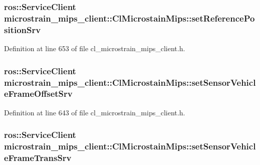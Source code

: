 \subsubsection[{\texorpdfstring{set\+Reference\+Position\+Srv}{setReferencePositionSrv}}]{\setlength{\rightskip}{0pt plus 5cm}ros\+::\+Service\+Client microstrain\+\_\+mips\+\_\+client\+::\+Cl\+Microstain\+Mips\+::set\+Reference\+Position\+Srv\hspace{0.3cm}{\ttfamily [protected]}}\hypertarget{classmicrostrain__mips__client_1_1ClMicrostainMips_a9f088d1a085409bf8a952fac38e8f3d3}{}\label{classmicrostrain__mips__client_1_1ClMicrostainMips_a9f088d1a085409bf8a952fac38e8f3d3}


Definition at line 653 of file cl\+\_\+microstrain\+\_\+mips\+\_\+client.\+h.

\subsubsection[{\texorpdfstring{set\+Sensor\+Vehicle\+Frame\+Offset\+Srv}{setSensorVehicleFrameOffsetSrv}}]{\setlength{\rightskip}{0pt plus 5cm}ros\+::\+Service\+Client microstrain\+\_\+mips\+\_\+client\+::\+Cl\+Microstain\+Mips\+::set\+Sensor\+Vehicle\+Frame\+Offset\+Srv\hspace{0.3cm}{\ttfamily [protected]}}\hypertarget{classmicrostrain__mips__client_1_1ClMicrostainMips_aa1d74713d0892154282f67b8a7724bdb}{}\label{classmicrostrain__mips__client_1_1ClMicrostainMips_aa1d74713d0892154282f67b8a7724bdb}


Definition at line 643 of file cl\+\_\+microstrain\+\_\+mips\+\_\+client.\+h.

\subsubsection[{\texorpdfstring{set\+Sensor\+Vehicle\+Frame\+Trans\+Srv}{setSensorVehicleFrameTransSrv}}]{\setlength{\rightskip}{0pt plus 5cm}ros\+::\+Service\+Client microstrain\+\_\+mips\+\_\+client\+::\+Cl\+Microstain\+Mips\+::set\+Sensor\+Vehicle\+Frame\+Trans\+Srv\hspace{0.3cm}{\ttfamily [protected]}}\hypertarget{classmicrostrain__mips__client_1_1ClMicrostainMips_a255d0c9b27b2f55013186e5210aed3d7}{}\label{classmicrostrain__mips__client_1_1ClMicrostainMips_a255d0c9b27b2f55013186e5210aed3d7}


